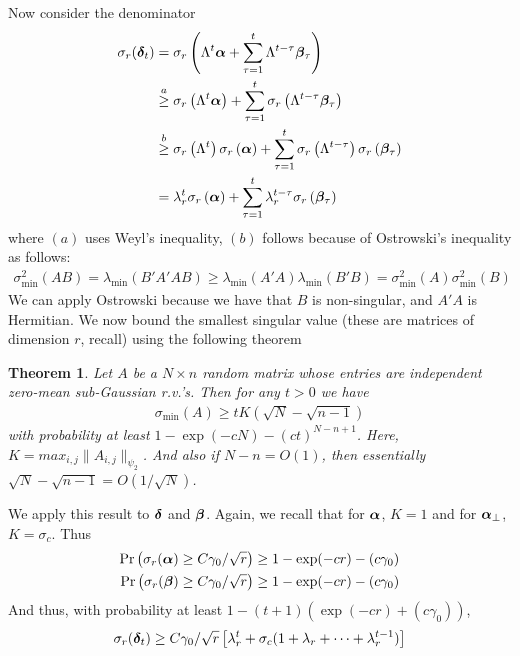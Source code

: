 \documentclass[10pt]{article}
\newtheorem{theorem}{Theorem}
\begin{document}
Now consider the denominator
\begin{align*}
\sigma_r(\bm{\delta}_t) &= \sigma_r\left(\Lambda^t \bm{\alpha} + \sum_{\tau=1}^t \Lambda^{t-\tau} \bm{\beta}_\tau\right) \\
&\overset{a}{\geq}  \sigma_r\left(\Lambda^t \bm{\alpha}\right) + \sum_{\tau=1}^t \sigma_r\left(\Lambda^{t-\tau} \bm{\beta}_\tau\right) \\
&\overset{b}{\geq}  \sigma_r\left(\Lambda^t \right) \sigma_r \left( \bm{\alpha}\right) + \sum_{\tau=1}^t \sigma_r\left(\Lambda^{t-\tau}\right) \sigma_r\left(\bm{\beta}_\tau\right) \\
&= \lambda_r^t \sigma_r\left( \bm{\alpha}\right) + \sum_{\tau=1}^t \lambda_{r}^{t-\tau} \sigma_r\left(\bm{\beta}_\tau\right) 
\end{align*}
where $(a)$ uses Weyl's inequality, $(b)$ follows because of Ostrowski's inequality as follows: 
\begin{align*}
\sigma_{\min}^2(AB) = \lambda_{\min}(B'A'A B) \geq \lambda_{\min}(A'A) \lambda_{\min}(B'B) = \sigma_{\min}^2(A) \sigma_{\min}^2(B)
\end{align*}
We can apply Ostrowski because we have that $B$ is non-singular, and $A'A$ is Hermitian. We now bound the smallest singular value (these are matrices of dimension $r$, recall) using the following theorem
\begin{theorem}
Let $A$ be a $N \times n$ random matrix whose entries are independent zero-mean sub-Gaussian r.v.'s. Then for any $t >0$ we have 
\begin{align*}
\sigma_{\min}(A) \geq t K (\sqrt{N} - \sqrt{n-1}) 
\end{align*}
with probability at least $1 -  \exp(-c N) - (ct)^{N-n+1}$. Here, $K = max_{i,j} \|A_{i,j}\|_{\psi_2}$. And also if $N - n = O(1)$, then essentially $\sqrt{N} - \sqrt{n-1} = O(1/\sqrt{N})$. 
\end{theorem}
We apply this result to $\bm{\delta}$ and $\bm{\beta}$. Again, we recall that for $\bm{\alpha}$, $K = 1$ and for $\bm{\alpha}_{\perp}$, $K = \sigma_c$. Thus
\begin{align*}
\Pr\left(\sigma_{r}(\bm{\alpha}) \geq C \gamma_0/\sqrt{r}\right) \geq  1 - \exp(-cr) - (c \gamma_0) \\
\Pr\left(\sigma_{r}(\bm{\beta}) \geq C \gamma_0/\sqrt{r}\right) \geq  1 - \exp(-cr) - (c \gamma_0)
\end{align*}
And thus, with probability at least $1 - (t+1) (\exp(-cr) + (c\gamma_0))$, 
\begin{align*}
\sigma_r(\bm{\delta}_t) \geq C \gamma_0/\sqrt{r} \left[ \lambda_r^t + \sigma_c (1 + \lambda_r + \cdots + \lambda_r^{t-1})\right]
\end{align*}
\end{document}
